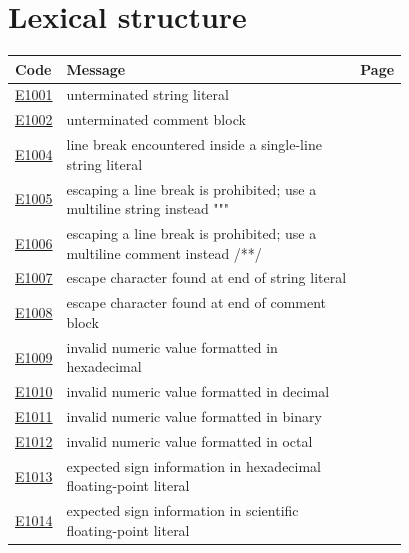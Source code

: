
\clearpage
\section{Lexical structure}
\label{sec:codes:lexical}

\begin{longtable}{@{}l p{0.78\linewidth} r@{}}
\toprule Code & Message & Page\\ \midrule \endhead
\hyperref[sec:codes:e1001]{E1001} & unterminated string literal \errhole{} & \pageref{sec:codes:e1001}\\
\hyperref[sec:codes:e1002]{E1002} & unterminated comment block \errhole{} & \pageref{sec:codes:e1002}\\
\hyperref[sec:codes:e1004]{E1004} & line break encountered inside a single-line string literal & \pageref{sec:codes:e1004}\\
\hyperref[sec:codes:e1005]{E1005} & escaping a line break is prohibited; use a multiline string instead """ & \pageref{sec:codes:e1005}\\
\hyperref[sec:codes:e1006]{E1006} & escaping a line break is prohibited; use a multiline comment instead /**/ & \pageref{sec:codes:e1006}\\
\hyperref[sec:codes:e1007]{E1007} & escape character found at end of string literal & \pageref{sec:codes:e1007}\\
\hyperref[sec:codes:e1008]{E1008} & escape character found at end of comment block & \pageref{sec:codes:e1008}\\
\hyperref[sec:codes:e1009]{E1009} & invalid numeric value formatted in hexadecimal & \pageref{sec:codes:e1009}\\
\hyperref[sec:codes:e1010]{E1010} & invalid numeric value formatted in decimal & \pageref{sec:codes:e1010}\\
\hyperref[sec:codes:e1011]{E1011} & invalid numeric value formatted in binary & \pageref{sec:codes:e1011}\\
\hyperref[sec:codes:e1012]{E1012} & invalid numeric value formatted in octal & \pageref{sec:codes:e1012}\\
\hyperref[sec:codes:e1013]{E1013} & expected sign information in hexadecimal floating-point literal & \pageref{sec:codes:e1013}\\
\hyperref[sec:codes:e1014]{E1014} & expected sign information in scientific floating-point literal & \pageref{sec:codes:e1014}\\

\end{longtable}
